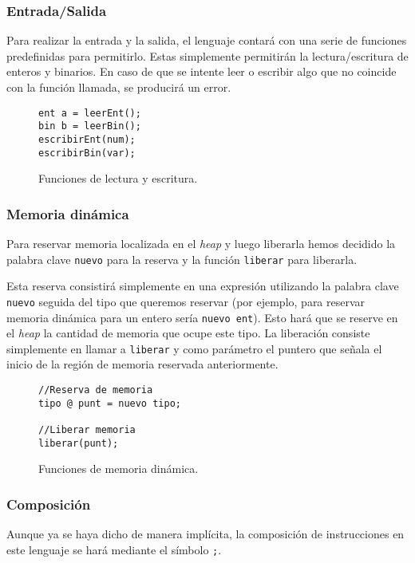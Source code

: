 \subsubsection{Entrada/Salida}
Para realizar la entrada y la salida, el lenguaje contará con una serie de
funciones predefinidas para permitirlo. Estas simplemente permitirán la
lectura/escritura de enteros y binarios. En caso de que se intente leer o
escribir algo que no coincide con la función llamada, se producirá un error.
\begin{figure}[htbp]
    \centering
    \begin{lstlisting}
ent a = leerEnt();
bin b = leerBin();
escribirEnt(num);
escribirBin(var);
    \end{lstlisting}
    \caption{Funciones de lectura y escritura.}
\end{figure}

\subsubsection{Memoria dinámica}
Para reservar memoria localizada en el \textit{heap} y luego liberarla
hemos decidido la palabra clave \lstinline{nuevo} para la reserva y la función
\lstinline{liberar} para liberarla. 

Esta reserva consistirá simplemente en una expresión utilizando la palabra clave
\lstinline{nuevo} seguida del tipo que queremos reservar (por ejemplo, para
reservar memoria dinámica para un entero sería \lstinline{nuevo ent}). Esto hará
que se reserve en el \textit{heap} la cantidad de memoria que ocupe este tipo.
La liberación consiste simplemente en llamar a \lstinline{liberar} y como
parámetro el puntero que señala el inicio de la región de memoria reservada
anteriormente.
\begin{figure}[htbp]
    \centering
    \begin{lstlisting}
//Reserva de memoria
tipo @ punt = nuevo tipo;

//Liberar memoria
liberar(punt);
    \end{lstlisting}
    \caption{Funciones de memoria dinámica.}
\end{figure}

\subsubsection{Composición}
Aunque ya se haya dicho de manera implícita, la composición de instrucciones en
este lenguaje se hará mediante el símbolo \lstinline{;}.

